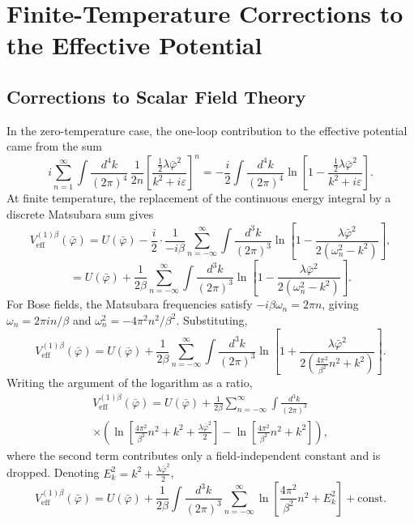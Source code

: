 \chapter{Finite-Temperature Corrections to the Effective Potential}

\section{Corrections to Scalar Field Theory}

In the zero-temperature case, the one-loop contribution to the effective
potential came from the sum
\begin{equation}
	i\sum_{n=1}^{\infty}\int\frac{d^4k}{(2\pi)^4}\,\frac{1}{2n}
	\left[\frac{\frac{1}{2}\lambda\bar\varphi^2}{k^2+i\varepsilon}\right]^n
	= -\frac{i}{2}\int\frac{d^4k}{(2\pi)^4}
	\ln\left[1 - \frac{\frac{1}{2}\lambda\bar\varphi^2}{k^2+i\varepsilon}\right].
\end{equation}
At finite temperature, the replacement of the continuous energy integral
by a discrete Matsubara sum gives
\begin{equation}
	V_{\text{eff}}^{(1)\beta}(\bar\varphi)
	= U(\bar\varphi) - \frac{i}{2}\cdot\frac{1}{-i\beta}
	\sum_{n=-\infty}^{\infty}\int\frac{d^3k}{(2\pi)^3}
	\ln\left[1 - \frac{\lambda\bar\varphi^2}
		{2(\omega_n^2-k^2)}\right],
\end{equation}
\begin{equation}
	= U(\bar\varphi) + \frac{1}{2\beta}
	\sum_{n=-\infty}^{\infty}\int\frac{d^3k}{(2\pi)^3}
	\ln\left[1 - \frac{\lambda\bar\varphi^2}
		{2(\omega_n^2-k^2)}\right].
\end{equation}
For Bose fields, the Matsubara frequencies satisfy
$-i\beta\omega_n = 2\pi n$, giving $\omega_n = 2\pi in/\beta$ and
$\omega_n^2 = -4\pi^2n^2/\beta^2$. Substituting,
\begin{equation}
	V_{\text{eff}}^{(1)\beta}(\bar\varphi)
	= U(\bar\varphi) + \frac{1}{2\beta}
	\sum_{n=-\infty}^{\infty}\int\frac{d^3k}{(2\pi)^3}
	\ln\left[1 + \frac{\lambda\bar\varphi^2}
		{2\left(\frac{4\pi^2}{\beta^2}n^2+k^2\right)}\right].
\end{equation}
Writing the argument of the logarithm as a ratio,
\begin{multline}
	V_{\text{eff}}^{(1)\beta}(\bar\varphi)
	= U(\bar\varphi) + \frac{1}{2\beta}
	\sum_{n=-\infty}^{\infty}\int\frac{d^3k}{(2\pi)^3} \\
	\times\left(\ln\left[\frac{4\pi^2}{\beta^2}n^2
		+ k^2 + \frac{\lambda\bar\varphi^2}{2}\right]
	- \ln\left[\frac{4\pi^2}{\beta^2}n^2+k^2\right]\right),
\end{multline}
where the second term contributes only a field-independent constant and
is dropped. Denoting $E_k^2 = k^2 + \frac{\lambda\bar\varphi^2}{2}$,
\begin{equation}
	V_{\text{eff}}^{(1)\beta}(\bar\varphi)
	= U(\bar\varphi) + \frac{1}{2\beta}
	\int\frac{d^3k}{(2\pi)^3}
	\sum_{n=-\infty}^{\infty}
	\ln\left[\frac{4\pi^2}{\beta^2}n^2+E_k^2\right]
	+ \text{const.}
\end{equation}

